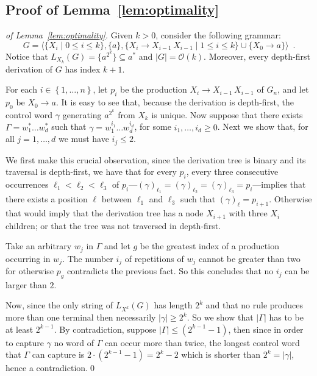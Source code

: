 \documentclass[final]{llncs}
\def\set#1{{\left\{ #1 \right\}}}
\def\tuple#1{{\langle #1 \rangle}}
\def\len#1{{\vert{#1}\vert}}
\begin{document}
\subsection{Proof of Lemma~\ref{lem:optimality}}
\begin{proof}[of Lemma~\ref{lem:optimality}]
Given \(k > 0\), consider the
following grammar: 
\[G = \tuple{ \{ X_i \mid 0\leq i\leq k \}, \{ a\}, \{ X_i \rightarrow
X_{i-1}\, X_{i-1} \mid 1\leq i \leq k \}\cup \{ X_0 \rightarrow a \}
}\enspace .\] Notice that \(L_{X_k}(G) = \{ a^{2^k} \} \subseteq a^*\)
and \(\len{G} = \mathcal{O}(k)\). Moreover, every depth-first
derivation of \(G\) has index \(k+1\).

For each \(i \in \set{1, \ldots, n}\), let \(p_i\) be the
production \(X_i \rightarrow X_{i-1}\, X_{i-1}\) of \(G_n\), and
let \(p_0\) be \(X_0 \rightarrow a\). It is easy to see that, because
the derivation is depth-first, the control word \(\gamma\)
generating \(a^{2^k}\) from \(X_k\) is unique. Now suppose that there
exists \(\Gamma = w_1^* \ldots w_d^*\) such that \(\gamma =
w_1^{i_1} \ldots w_d^{i_d}\), for some \(i_1, \ldots, i_d \geq
0\). Next we show that, for all \(j=1,\ldots,d\) we must
have \(i_j \leq 2\).

We first make this crucial observation, since the derivation tree is
binary and its traversal is depth-first, we have that for
every \(p_i\), every three consecutive occurrences
\(\ell_1<\ell_2<\ell_3\) of \(p_i\)---\( (\gamma)_{\ell_1}=(\gamma)_{\ell_2}=(\gamma)_{\ell_3}=p_i\)---implies that there exists a position
\(\ell\) between \(\ell_1\) and \(\ell_3\) such that \( (\gamma)_{\ell} = p_{i+1} \).
Otherwise that would imply that the derivation tree has a node \(X_{i+1}\) with three \(X_{i}\) children;
or that the tree was not traversed in depth-first.

Take an arbitrary \(w_j\) in \(\Gamma\) and let \(g\) be the greatest
index of a production occurring in \(w_j\).  The number \(i_j\) of
repetitions of \(w_j\) cannot be greater than two for
otherwise \(p_g\) contradicts the previous fact.  So this concludes
that no \(i_j\) can be larger than \(2\).

Now, since the only string of \(L_{X^k}(G)\) has length \(2^k\) and that
no rule produces more than one terminal then
necessarily \(\len{\gamma} \geq 2^k\). So we show that
\(\len{\Gamma}\) has to be at least \(2^{k-1}\). By contradiction, suppose
\(\len{\Gamma}\leq (2^{k-1}-1)\), then since in order to capture \(\gamma\) no
word of \(\Gamma\) can occur more than twice, the longest control word that
\(\Gamma\) can capture is \(2 \cdot (2^{k-1}-1) = 2^{k}-2\) which is shorter
than \(2^k=\len{\gamma}\), hence a contradiction.\qed
\end{proof}
\end{document}
